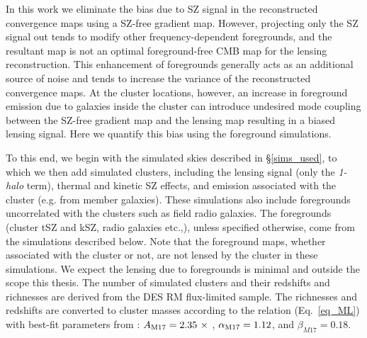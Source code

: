 In this work we eliminate the bias due to SZ signal in the reconstructed convergence maps using a SZ-free gradient map. 
However, projecting only the SZ signal out tends to modify other frequency-dependent foregrounds, and the resultant map is not an optimal foreground-free CMB map for the lensing reconstruction. 
This enhancement of foregrounds generally acts as an additional source of noise and tends to increase the variance of the reconstructed convergence maps. 
At the cluster locations, however, an increase in foreground emission due to galaxies inside the cluster can introduce undesired mode coupling between the SZ-free gradient map and the lensing map resulting in a biased lensing signal. 
Here we quantify this bias using the \cite{sehgal10} foreground simulations.

To this end, we begin with the simulated skies described in \S\ref{sims_used}, to which we then add simulated clusters, including the lensing signal (only the {\it 1-halo} term), thermal and kinetic SZ effects, and emission associated with the cluster (e.g. from member galaxies). %
These simulations also include foregrounds uncorrelated with the clusters such as field radio galaxies.
The foregrounds (cluster tSZ and kSZ, radio galaxies etc.,), unless specified otherwise, come from the \cite{sehgal10} simulations described below.
Note that the foreground maps, whether associated with the cluster or not, are not lensed by the cluster in these simulations. 
We expect the lensing due to foregrounds is minimal and outside the scope this thesis. 
The number of simulated clusters and their redshifts and richnesses are derived from the  DES RM \whichyear{} flux-limited sample. %
The richnesses and redshifts are converted to cluster masses according to the \ML{} relation (Eq.~\ref{eq_ML}) with best-fit parameters from \citet{melchoir17}: $A_{\rm M17} = 2.35\ \times$ \munits, $\alpha_{\rm M17} = 1.12$, and $\beta_{M17} = 0.18$.  

